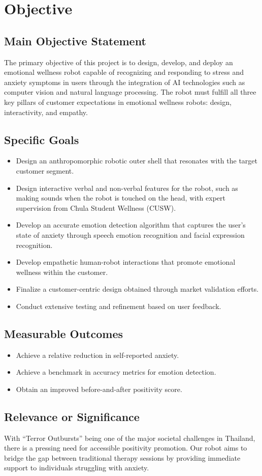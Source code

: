 \section{Objective}

\subsection{Main Objective Statement}
The primary objective of this project is to design, develop, and deploy an emotional wellness robot capable of recognizing and responding to stress and anxiety symptoms in users through the integration of AI technologies such as computer vision and natural language processing. The robot must fulfill all three key pillars of customer expectations in emotional wellness robots: design, interactivity, and empathy.

\subsection{Specific Goals}
\begin{itemize}
    \item Design an anthropomorphic robotic outer shell that resonates with the target customer segment.
    \item Design interactive verbal and non-verbal features for the robot, such as making sounds when the robot is touched on the head, with expert supervision from Chula Student Wellness (CUSW).
    \item Develop an accurate emotion detection algorithm that captures the user’s state of anxiety through speech emotion recognition and facial expression recognition.
    \item Develop empathetic human-robot interactions that promote emotional wellness within the customer.
    \item Finalize a customer-centric design obtained through market validation efforts.
    \item Conduct extensive testing and refinement based on user feedback.
\end{itemize}

\subsection{Measurable Outcomes}
\begin{itemize}
    \item Achieve a relative reduction in self-reported anxiety.
    \item Achieve a benchmark in accuracy metrics for emotion detection.
    \item Obtain an improved before-and-after positivity score.
\end{itemize}

\subsection{Relevance or Significance}
With “Terror Outbursts” being one of the major societal challenges in Thailand, there is a pressing need for accessible positivity promotion. Our robot aims to bridge the gap between traditional therapy sessions by providing immediate support to individuals struggling with anxiety.